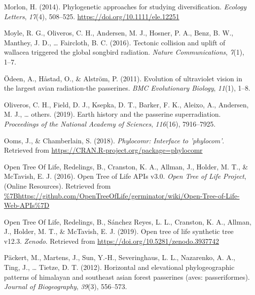 \documentclass[
  english,
  man]{apa6}
\newlength{\cslhangindent}
\newlength{\cslentryspacingunit} %
\newenvironment{CSLReferences}[2] %
 {%
  \setlength{\parindent}{0pt}
  \ifodd #1
  \let\oldpar\par
  \def\par{\hangindent=\cslhangindent\oldpar}
  \fi
  \setlength{\parskip}{#2\cslentryspacingunit}
 }%
 {}
\begin{document}
\begin{CSLReferences}{1}{0}
\leavevmode{}%
Morlon, H. (2014). {Phylogenetic approaches for studying diversification.} \emph{{Ecology Letters}}, \emph{17}(4), 508--525. \url{https://doi.org/10.1111/ele.12251}

\leavevmode{}%
Moyle, R. G., Oliveros, C. H., Andersen, M. J., Hosner, P. A., Benz, B. W., Manthey, J. D., \ldots{} Faircloth, B. C. (2016). Tectonic collision and uplift of wallacea triggered the global songbird radiation. \emph{Nature Communications}, \emph{7}(1), 1--7.

\leavevmode{}%
Ödeen, A., Håstad, O., \& Alström, P. (2011). Evolution of ultraviolet vision in the largest avian radiation-the passerines. \emph{BMC Evolutionary Biology}, \emph{11}(1), 1--8.

\leavevmode{}%
Oliveros, C. H., Field, D. J., Ksepka, D. T., Barker, F. K., Aleixo, A., Andersen, M. J., \ldots{} others. (2019). Earth history and the passerine superradiation. \emph{Proceedings of the National Academy of Sciences}, \emph{116}(16), 7916--7925.

\leavevmode{}%
Ooms, J., \& Chamberlain, S. (2018). \emph{Phylocomr: Interface to 'phylocom'}. Retrieved from \url{https://CRAN.R-project.org/package=phylocomr}

\leavevmode{}%
Open Tree Of Life, Redelings, B., Cranston, K. A., Allman, J., Holder, M. T., \& McTavish, E. J. (2016). {Open Tree of Life APIs v3.0}. \emph{{Open Tree of Life Project}}, (Online Resources). Retrieved from \url{\%7Bhttps://github.com/OpenTreeOfLife/germinator/wiki/Open-Tree-of-Life-Web-APIs\%7D}

\leavevmode{}%
Open Tree Of Life, Redelings, B., Sánchez Reyes, L. L., Cranston, K. A., Allman, J., Holder, M. T., \& McTavish, E. J. (2019). Open tree of life synthetic tree v12.3. \emph{Zenodo}. Retrieved from \url{https://doi.org/10.5281/zenodo.3937742}

\leavevmode{}%
Päckert, M., Martens, J., Sun, Y.-H., Severinghaus, L. L., Nazarenko, A. A., Ting, J., \ldots{} Tietze, D. T. (2012). Horizontal and elevational phylogeographic patterns of himalayan and southeast asian forest passerines (aves: passeriformes). \emph{Journal of Biogeography}, \emph{39}(3), 556--573.


\end{CSLReferences}
\end{document}
